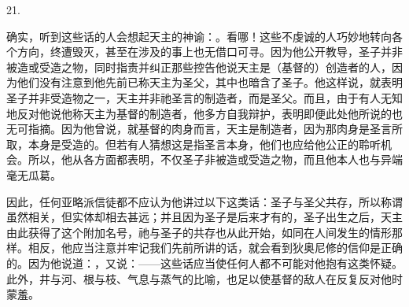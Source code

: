 21. \par

确实，听到这些话的人会想起天主的神谕：。看哪！这些不虔诚的人巧妙地转向各个方向，终遭毁灭，甚至在涉及的事上也无借口可寻。因为他公开教导，圣子并非被造或受造之物，同时指责并纠正那些控告他说天主是（基督的）创造者的人，因为他们没有注意到他先前已称天主为圣父，其中也暗含了圣子。他这样说，就表明圣子并非受造物之一，天主并非祂圣言的制造者，而是圣父。而且，由于有人无知地反对他说他称天主为基督的制造者，他多方自我辩护，表明即便此处他所说的也无可指摘。因为他曾说，就基督的肉身而言，天主是制造者，因为那肉身是圣言所取，本身是受造的。但若有人猜想这是指圣言本身，他们也应给他公正的聆听机会。所以，他从各方面都表明，不仅圣子非被造或受造之物，而且他本人也与异端毫无瓜葛。\par

\par

因此，任何亚略派信徒都不应认为他讲过以下这类话：圣子与圣父共存，所以称谓虽然相关，但实体却相去甚远；并且因为圣子是后来才有的，圣子出生之后，天主由此获得了这个附加名号，祂与圣子的共存也从此开始，如同在人间发生的情形那样。相反，他应当注意并牢记我们先前所讲的话，就会看到狄奥尼修的信仰是正确的。因为他说道：，又说：——这些话应当使任何人都不可能对他抱有这类怀疑。此外，井与河、根与枝、气息与蒸气的比喻，也足以使基督的敌人在反复反对他时蒙羞。\par

\par

